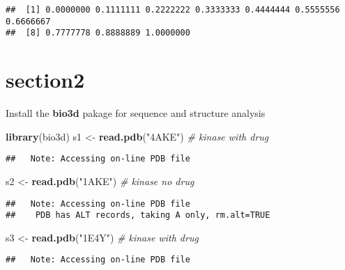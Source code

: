 \documentclass[]{article}
\newenvironment{Shaded}{\begin{snugshade}}{\end{snugshade}}
\newcommand{\KeywordTok}[1]{\textcolor[rgb]{0.13,0.29,0.53}{\textbf{#1}}}
\newcommand{\StringTok}[1]{\textcolor[rgb]{0.31,0.60,0.02}{#1}}
\newcommand{\CommentTok}[1]{\textcolor[rgb]{0.56,0.35,0.01}{\textit{#1}}}
\newcommand{\NormalTok}[1]{#1}
\begin{document}
\begin{verbatim}
##  [1] 0.0000000 0.1111111 0.2222222 0.3333333 0.4444444 0.5555556 0.6666667
##  [8] 0.7777778 0.8888889 1.0000000
\end{verbatim}

\section{section2}\label{section2}

Install the \textbf{bio3d} pakage for sequence and structure analysis

\begin{Shaded}
\begin{Highlighting}[]
\KeywordTok{library}\NormalTok{(bio3d)}
\NormalTok{s1 <-}\StringTok{ }\KeywordTok{read.pdb}\NormalTok{(}\StringTok{"4AKE"}\NormalTok{)  }\CommentTok{# kinase with drug}
\end{Highlighting}
\end{Shaded}

\begin{verbatim}
##   Note: Accessing on-line PDB file
\end{verbatim}

\begin{Shaded}
\begin{Highlighting}[]
\NormalTok{s2 <-}\StringTok{ }\KeywordTok{read.pdb}\NormalTok{(}\StringTok{"1AKE"}\NormalTok{)  }\CommentTok{# kinase no drug}
\end{Highlighting}
\end{Shaded}

\begin{verbatim}
##   Note: Accessing on-line PDB file
##    PDB has ALT records, taking A only, rm.alt=TRUE
\end{verbatim}

\begin{Shaded}
\begin{Highlighting}[]
\NormalTok{s3 <-}\StringTok{ }\KeywordTok{read.pdb}\NormalTok{(}\StringTok{"1E4Y"}\NormalTok{)  }\CommentTok{# kinase with drug}
\end{Highlighting}
\end{Shaded}

\begin{verbatim}
##   Note: Accessing on-line PDB file
\end{verbatim}
\end{document}
